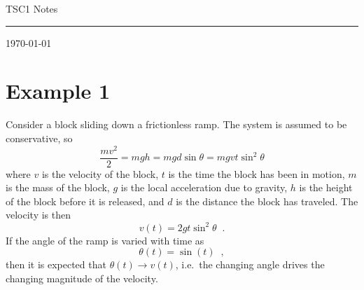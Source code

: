 \documentclass[a4paper,11pt]{article}
\begin{document}
{\Huge TSC1 Notes}

\hfill\rule{150mm}{.1pt}

\hfill{\small \today}

\section{Example 1}
Consider a block sliding down a frictionless ramp.  The system is assumed to be conservative, so
$$
\frac{mv^2}{2} = mgh = mg d\sin\theta = mg vt\sin^2 \theta
$$
where $v$ is the velocity of the block, $t$ is the time the block has been in motion, $m$ is the mass of the block, $g$ is the local acceleration due to gravity, $h$ is the height of the block before it is released, and $d$ is the distance the block has traveled.  The velocity is then  
$$
v(t) = 2gt\sin^2 \theta\;\;.
$$
If the angle of the ramp is varied with time as
$$
\theta(t) = \sin(t)\;\;,
$$
then it is expected that $\theta(t)\rightarrow v(t)$, i.e.\ the changing angle drives the changing magnitude of the velocity.
\end{document}
